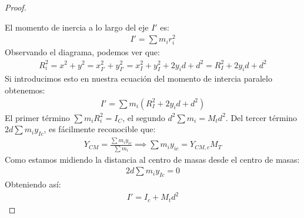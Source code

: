 \documentclass{article}
\begin{document}
\begin{proof}
\begin{center}
\begin{tikzpicture}[x=0.75pt,y=0.75pt,yscale=-1,xscale=1]
\end{tikzpicture}
    \end{center}
    El momento de inercia a lo largo del eje $I'$ es:
    \begin{equation}
        \begin{split}
            I' = \sum m_{i} r_{i}^{2}
        \end{split}
    \end{equation}
    Observando el diagrama, podemos ver que:
    \begin{equation}
        \begin{split}
            R_{i}^{2} = x^{2}+y^{2}=x_{I'}^{2}+y_{I'}^{2} 
            = x^{2}_{I}+y_{I}^{2}+2y_{i}d +d^{2} = R_{I}^{2}+2y_{i}d +d^{2}
        \end{split}
    \end{equation}
    Si introducimos esto en nuestra ecuación del momento de intercia paralelo obtenemos:
    \begin{equation}
        \begin{split}
            I' = \sum m_{i}(R_{I}^{2}+2y_{i}d +d^{2})
        \end{split}
    \end{equation}
    El primer término $\sum m_{i} R_{i}^{2} = I_{C}$, el segundo $d^{2} \sum m_{i} = M_{t}d^{2}$.
    Del tercer término $2d \sum m_{i} y_{Ic}$, es fácilmente reconocible que:
    \begin{equation}
        \begin{split}
            Y_{CM} = \frac{\sum m_{i} y_{ic}}{\sum m_{i}} \implies \sum m_{i} y_{ic} = Y_{CM,c} M_{T}
        \end{split}
    \end{equation}
    Como estamos midiendo la distancia al centro de masas desde el centro de masas:
    \begin{equation}
        \begin{split}
            2d \sum m_{i} y_{Ic} = 0
        \end{split}
    \end{equation}
    Obteniendo así:
    \begin{equation}
        \begin{split}
            I' = I_{c} + M_{t} d^{2}
        \end{split}
    \end{equation}
\end{proof}
\end{document}
